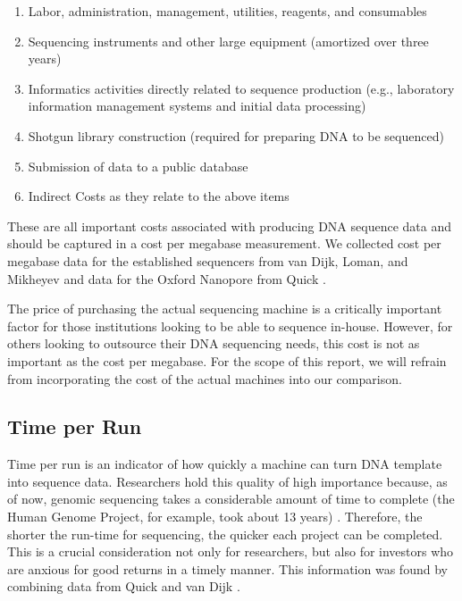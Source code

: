 \documentclass[12pt,letterpaper]{report}
\begin{document}
\begin{enumerate}
  \item Labor, administration, management, utilities, reagents, and consumables
  \item Sequencing instruments and other large equipment (amortized over three years)
  \item Informatics activities directly related to sequence production (e.g., laboratory information management systems and initial data processing)
  \item Shotgun library construction (required for preparing DNA to be sequenced)
  \item Submission of data to a public database
  \item Indirect Costs as they relate to the above items
\end{enumerate}

These are all important costs associated with producing DNA sequence data and should be captured in a cost per megabase measurement. We collected cost per megabase data for the established sequencers from van Dijk, Loman, and Mikheyev \cite{van_Dijk,Loman,Mikheyev} and data for the Oxford Nanopore from Quick \cite{Quick}.

The price of purchasing the actual sequencing machine is a critically important factor for those institutions looking to be able to sequence in-house. However, for others looking to outsource their DNA sequencing needs, this cost is not as important as the cost per megabase. For the scope of this report, we will refrain from incorporating the cost of the actual machines into our comparison.

\subsection{Time per Run}
	
Time per run is an indicator of how quickly a machine can turn DNA template into sequence data. Researchers hold this quality of high importance because, as of now, genomic sequencing takes a considerable amount of time to complete (the Human Genome Project, for example, took about 13 years) \cite{nhgrifaq}. Therefore, the shorter the run-time for sequencing, the quicker each project can be completed. This is a crucial consideration not only for researchers, but also for investors who are anxious for good returns in a timely manner. This information was found by combining data from Quick and van Dijk \cite{Quick, van_Dijk}.
     
\end{document}

